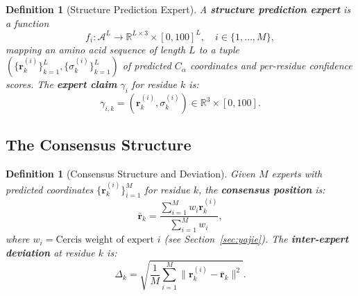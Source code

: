 \documentclass[12pt,a4paper]{article}
\newtheorem{definition}[theorem]{Definition}
\theoremstyle{remark}
\newcommand{\R}{\mathbb{R}}
\begin{document}
\begin{definition}[Structure Prediction Expert]
\label{def:struct-expert}
A \textbf{structure prediction expert} is a function
\begin{equation}
    f_i: \mathcal{A}^L \to \R^{L \times 3} \times [0,100]^L, \quad i \in \{1, \dots, M\},
\end{equation}
mapping an amino acid sequence of length $L$ to a tuple $(\{\mathbf{r}_k^{(i)}\}_{k=1}^{L}, \{\sigma_k^{(i)}\}_{k=1}^{L})$ of predicted $C_\alpha$ coordinates and per-residue confidence scores.
The \textbf{expert claim} $\gamma_i$ for residue $k$ is:
\begin{equation}
    \gamma_{i,k} = (\mathbf{r}_k^{(i)}, \sigma_k^{(i)}) \in \R^3 \times [0,100].
\end{equation}
\end{definition}

\subsection{The Consensus Structure}

\begin{definition}[Consensus Structure and Deviation]
Given $M$ experts with predicted coordinates $\{\mathbf{r}_k^{(i)}\}_{i=1}^{M}$ for residue $k$, the \textbf{consensus position} is:
\begin{equation}
    \bar{\mathbf{r}}_k = \frac{\sum_{i=1}^{M} w_i \mathbf{r}_k^{(i)}}{\sum_{i=1}^{M} w_i},
\end{equation}
where $w_i = \text{Cercis weight of expert } i$ (see Section~\ref{sec:yajie}).
The \textbf{inter-expert deviation} at residue $k$ is:
\begin{equation}
    \Delta_k = \sqrt{\frac{1}{M}\sum_{i=1}^{M} \|\mathbf{r}_k^{(i)} - \bar{\mathbf{r}}_k\|^2}.
\end{equation}
\end{definition}
\end{document}
